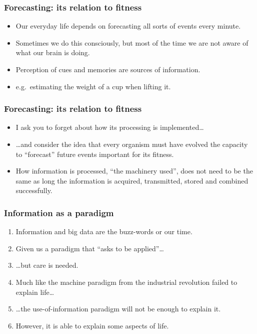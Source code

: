 \documentclass[11pt]{beamer}\usepackage[]{graphicx}\usepackage[]{xcolor}
\begin{document}
\begin{frame}%
  \frametitle{Forecasting: its relation to fitness}
  \begin{itemize}
\item Our everyday life depends on forecasting all sorts of events every minute.
    \item Sometimes we do this consciously, but most of the time we are not aware of what our brain is doing.
    \item Perception of cues and memories are sources of information.
    \item e.g.\ estimating the weight of a cup when lifting it.
  \end{itemize}
\end{frame}

\begin{frame}%
  \frametitle{Forecasting: its relation to fitness}
  \begin{itemize}
    \item I ask you to forget about how its processing is implemented\ldots
    \item \ldots and consider the idea that every organism must have evolved the capacity to ``forecast'' future events important for its fitness.
    \item How information is processed, ``the machinery used'', does not need to be the same as long the information is acquired, transmitted, stored and combined successfully.
  \end{itemize}
\end{frame}

\begin{frame}%
\frametitle{Information as a paradigm}
\begin{enumerate}
  \item Information and big data are the buzz-words or our time.
  \item Given us a paradigm that ``asks to be applied''\ldots
  \item \ldots but care is needed.
  \item Much like the machine paradigm from the industrial revolution failed to explain life\ldots
  \item \ldots the use-of-information paradigm will not be enough to explain it.
  \item However, it is able to explain some aspects of life.
\end{enumerate}
\end{frame}
\end{document}
